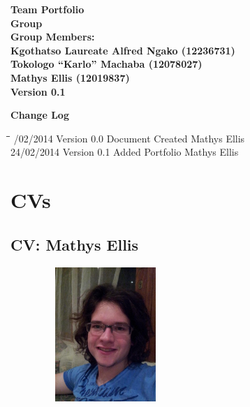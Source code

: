 \documentclass[12pt]{article}
\newcommand{\Title}{Team Portfolio} %
\begin{document}
	\begin{center}%
	
	  \LARGE \bf \Title \\[4em]
	  \LARGE {\bf Group }\\[1em]
	  \LARGE {\bf Group Members:}\\[2em]
	  \large
	      Kgothatso Laureate Alfred Ngako	(12236731) \\[1em]
	   	  Tokologo “Karlo” Machaba			(12078027) \\[1em]
	   	  Mathys Ellis						(12019837) \\[8em]
	   	  {\bf Version 0.1}	    
	\end{center}%
	
	\newpage
	{\LARGE \bf Change Log}\\[2em]	
		\begin{tabbing}
			\hspace*{3cm}\=\hspace*{3cm}\=\hspace*{8cm}\=\hspace*{3cm} /02/2014 \> Version 0.0 \> Document Created \> Mathys Ellis\\ 
			24/02/2014 \> Version 0.1 \> Added Portfolio \> Mathys Ellis\\
		\end{tabbing}
			
	\newpage
		\tableofcontents
			
	\newpage
	\section{CVs}
	
	\newpage
	\subsection{CV: Mathys Ellis}
	
	\begin{figure}[ht!]
		\centering
		\includegraphics[width=2in, height=2in]{./Pictures/MathysEllis.jpg}
	\end{figure}
		
\end{document}
